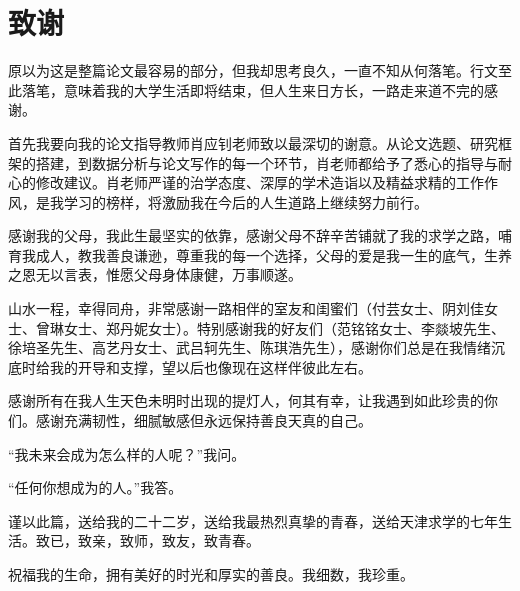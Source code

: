 \chapter{\texorpdfstring{致\quad 谢}{致谢}} %

原以为这是整篇论文最容易的部分，但我却思考良久，一直不知从何落笔。行文至此落笔，意味着我的大学生活即将结束，但人生来日方长，一路走来道不完的感谢。

首先我要向我的论文指导教师肖应钊老师致以最深切的谢意。从论文选题、研究框架的搭建，到数据分析与论文写作的每一个环节，肖老师都给予了悉心的指导与耐心的修改建议。肖老师严谨的治学态度、深厚的学术造诣以及精益求精的工作作风，是我学习的榜样，将激励我在今后的人生道路上继续努力前行。

感谢我的父母，我此生最坚实的依靠，感谢父母不辞辛苦铺就了我的求学之路，哺育我成人，教我善良谦逊，尊重我的每一个选择，父母的爱是我一生的底气，生养之恩无以言表，惟愿父母身体康健，万事顺遂。

山水一程，幸得同舟，非常感谢一路相伴的室友和闺蜜们\nolinebreak[3]（付芸女士、阴刘佳女士、曾琳女士、郑丹妮女士）。特别感谢我的好友们\nolinebreak[3]（范铭铭女士、李燚坡先生、徐培圣先生、高艺丹女士、武吕轲先生、陈琪浩先生），感谢你们总是在我情绪沉底时给我的开导和支撑，望以后也像现在这样伴彼此左右。

感谢所有在我人生天色未明时出现的提灯人，何其有幸，让我遇到如此珍贵的你们。感谢充满韧性，细腻敏感但永远保持善良天真的自己。

“我未来会成为怎么样的人呢？”我问。

“任何你想成为的人。”我答。

谨以此篇，送给我的二十二岁，送给我最热烈真挚的青春，送给天津求学的七年生活。致已，致亲，致师，致友，致青春。

祝福我的生命，拥有美好的时光和厚实的善良。我细数，我珍重。

\clearpage

